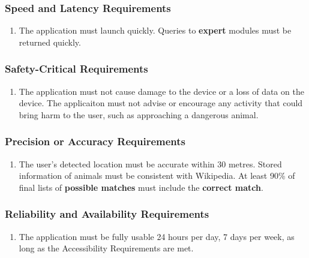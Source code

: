 \documentclass[]{article}
\begin{document}
\cbstart
\subsubsection{Speed and Latency Requirements}
\label{ssub:speed_and_latency_requirements}
\begin{enumerate}[{PR}1. ]
	\item The application must launch quickly. Queries to \textbf{expert} modules must be returned quickly.
\end{enumerate}
\cbend

\subsubsection{Safety-Critical Requirements}
\label{ssub:safety_critical_requirements}
\begin{enumerate}[{PR}2. ]
	\item The application must not cause damage to the device or a loss of data on the device. The applicaiton must not advise or encourage any activity that could bring harm to the user, such as approaching a dangerous animal.
\end{enumerate}

\subsubsection{Precision or Accuracy Requirements}
\label{ssub:precision_or_accuracy_requirements}
\begin{enumerate}[{PR}3. ]
	\item The user's detected location must be accurate within 30 metres. Stored information of animals must be consistent with Wikipedia. At least 90\% of final lists of \textbf{possible matches} must include the \textbf{correct match}.
\end{enumerate}

\subsubsection{Reliability and Availability Requirements}
\label{ssub:reliability_and_availability_requirements}
\begin{enumerate}[{PR}4. ]
	\item The application must be fully usable 24 hours per day, 7 days per week, as long as the Accessibility Requirements are met.
\end{enumerate}
\end{document}
